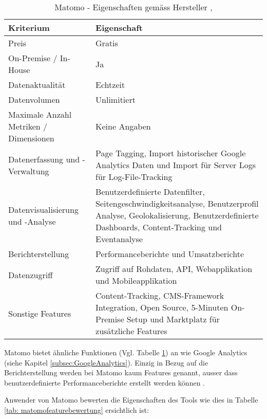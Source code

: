 \begin{table}[h]
	\centering
	\begin{tabular}{ | p{4cm} | p{10cm} |}
		\hline
		\textbf{Kriterium} & \textbf{Eigenschaft}  \\ 
		\hline
    Preis & Gratis \\
    \hline
    On-Premise / In-House & Ja \\
    \hline
    Datenaktualität & Echtzeit \\
    \hline
		Datenvolumen & Unlimitiert \\
    \hline
    Maximale Anzahl Metriken / Dimensionen & Keine Angaben \\
    \hline
		Datenerfassung und -Verwaltung & Page Tagging, Import historischer Google Analytics Daten und Import für Server Logs für Log-File-Tracking \\
    \hline
    Datenvisualisierung und -Analyse & Benutzerdefinierte Datenfilter, Seitengeschwindigkeitsanalyse, Benutzerprofil Analyse,  Geolokalisierung, Benutzerdefinierte Dashboards, Content-Tracking und Eventanalyse \\
    \hline
    Berichterstellung & Performanceberichte und Umsatzberichte \\
    \hline
    Datenzugriff & Zugriff auf Rohdaten, API, Webapplikation und Mobileapplikation \\
    \hline
    Sonstige Features & Content-Tracking, CMS-Framework Integration, Open Source, 5-Minuten On-Premise Setup und Marktplatz für zusätzliche Features \\
		\hline  
	\end{tabular}
	\caption{Matomo - Eigenschaften gemäss Hersteller \parencite{MamotoCloudVsOnPremise}, \parencite{MamotoFeatures}}
	\label{tab: MatomoFeatures}
\end{table}

Matomo bietet ähnliche Funktionen (Vgl. Tabelle \ref{tab: MatomoFeatures}) an wie Google Analytics (siehe Kapitel \ref{subsec:GoogleAnalytics}). Einzig in Bezug auf die Berichterstellung werden bei Matomo kaum Features genannt, ausser dass benutzerdefinierte Performanceberichte erstellt werden können \parencite{MamotoFeatures}. 

\newpage

Anwender von Matomo bewerten die Eigenschaften des Tools wie dies in Tabelle \ref{tab: matomofeaturebewertung} ersichtlich ist:

